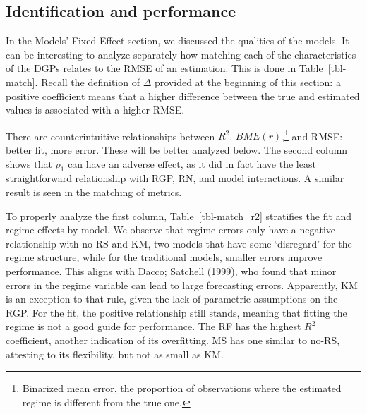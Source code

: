 \documentclass[
  letterpaper,
  DIV=11,
  numbers=noendperiod]{scrartcl}
\numberwithin{equation}{section}
\numberwithin{table}{section}
\numberwithin{figure}{section}
\begin{document}
\subsection{Identification and performance}\label{sec-perf-id}

In the Models' Fixed Effect section, we discussed the qualities of the
models. It can be interesting to analyze separately how matching each of
the characteristics of the DGPs relates to the RMSE of an estimation.
This is done in Table~\ref{tbl-match}. Recall the definition of
\(\Delta\) provided at the beginning of this section: a positive
coefficient means that a higher difference between the true and
estimated values is associated with a higher RMSE.

There are counterintuitive relationships between \(R^2\),
\(BME(r)\),\footnote{Binarized mean error, the proportion of
  observations where the estimated regime is different from the true
  one.} and RMSE: better fit, more error. These will be better analyzed
below. The second column shows that \(\rho_1\) can have an adverse
effect, as it did in fact have the least straightforward relationship
with RGP, RN, and model interactions. A similar result is seen in the
matching of metrics.

\begin{table}[!htbp]

\caption{\label{tbl-match}RMSE and identification}

\centering{



}

\end{table}%

To properly analyze the first column, Table~\ref{tbl-match_r2}
stratifies the fit and regime effects by model. We observe that regime
errors only have a negative relationship with no-RS and KM, two models
that have some `disregard' for the regime structure, while for the
traditional models, smaller errors improve performance. This aligns with
Dacco; Satchell (1999), who found that minor errors in the regime
variable can lead to large forecasting errors. Apparently, KM is an
exception to that rule, given the lack of parametric assumptions on the
RGP. For the fit, the positive relationship still stands, meaning that
fitting the regime is not a good guide for performance. The RF has the
highest \(R^2\) coefficient, another indication of its overfitting. MS
has one similar to no-RS, attesting to its flexibility, but not as small
as KM.
\end{document}
